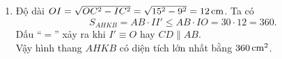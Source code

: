 \begin{bt}
{\begin{enumerate}
			Hai tam giác vuông $IHE$ và $IKF$ có $IH=IK$ và $\widehat{HIE}=\widehat{KIF}$ nên bằng nhau.
			Suy ra,
			\[S_{AHKB}=S_{AEFB}=AB\cdot II'.\tag{1}\]
			Mặt khác,
			\[S_{ABC}+S_{ADB}=\dfrac{1}{2}CC'\cdot AB+\dfrac{1}{2}DD'\cdot AB=AB\cdot II'.\tag{2}\]
			Từ $(1)$ và $(2)$, suy ra \[S_{AHKB}=S_{ACB}+S_{ADB}.\]
			\item Độ dài $OI=\sqrt{OC^2-IC^2}=\sqrt{15^2-9^2}=12\text{\,cm}$.
			Ta có
			\[S_{AHKB}=AB\cdot II' \leqslant AB\cdot IO=30\cdot 12=360.\]
			Dấu ``$=$'' xảy ra khi $I'\equiv O$ hay $CD \parallel AB$.\\
			Vậy hình thang $AHKB$ có diện tích lớn nhất bằng $360\text{\,cm}^2$. 			
		\end{enumerate}
	}
\end{bt}
  